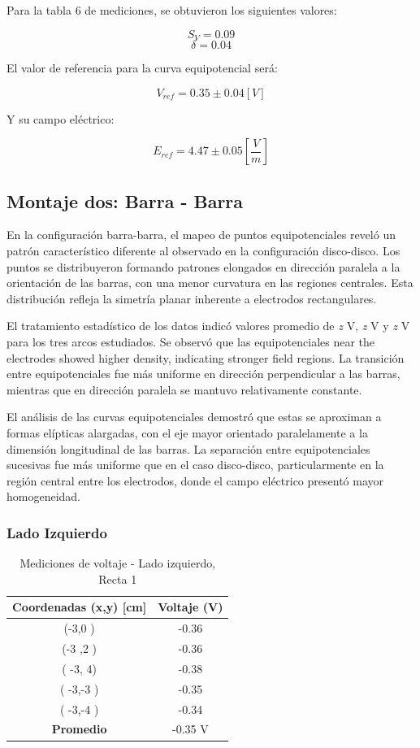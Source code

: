 \documentclass[11pt,twocolumn]{article}
\begin{document}
Para la tabla 6 de mediciones, se obtuvieron los siguientes valores:

\[S_V = 0.09\]
\[\delta = 0.04\]

El valor de referencia para la curva equipotencial será:

\[V_{ref} = 0.35 \pm 0.04 [V]\]

Y su campo eléctrico:

\[E_{ref} = 4.47 \pm 0.05 [\frac{V}{m}]\]

\subsection*{Montaje dos: Barra - Barra}

En la configuración barra-barra, el mapeo de puntos equipotenciales reveló un patrón característico diferente al observado en la configuración disco-disco. Los puntos se distribuyeron formando patrones elongados en dirección paralela a la orientación de las barras, con una menor curvatura en las regiones centrales. Esta distribución refleja la simetría planar inherente a electrodos rectangulares.

El tratamiento estadístico de los datos indicó valores promedio de \textit{z} V, \textit{z} V y \textit{z} V para los tres arcos estudiados. Se observó que las equipotenciales near the electrodes showed higher density, indicating stronger field regions. La transición entre equipotenciales fue más uniforme en dirección perpendicular a las barras, mientras que en dirección paralela se mantuvo relativamente constante.

El análisis de las curvas equipotenciales demostró que estas se aproximan a formas elípticas alargadas, con el eje mayor orientado paralelamente a la dimensión longitudinal de las barras. La separación entre equipotenciales sucesivas fue más uniforme que en el caso disco-disco, particularmente en la región central entre los electrodos, donde el campo eléctrico presentó mayor homogeneidad.

\subsubsection*{Lado Izquierdo}

\begin{table}[h]
\centering
\caption{Mediciones de voltaje - Lado izquierdo, Recta 1}
\begin{tabular}{cc}
\toprule
\textbf{Coordenadas (x,y) [cm]} & \textbf{Voltaje (V)} \\
\midrule
(-3,0 ) &  -0.36\\
(-3 ,2 ) &  -0.36\\
( -3, 4) &  -0.38\\
( -3,-3 ) &  -0.35\\
( -3,-4 ) & -0.34 \\
\midrule
\textbf{Promedio} &  -0.35 V\\
\bottomrule
\end{tabular}
\end{table}
\end{document}
